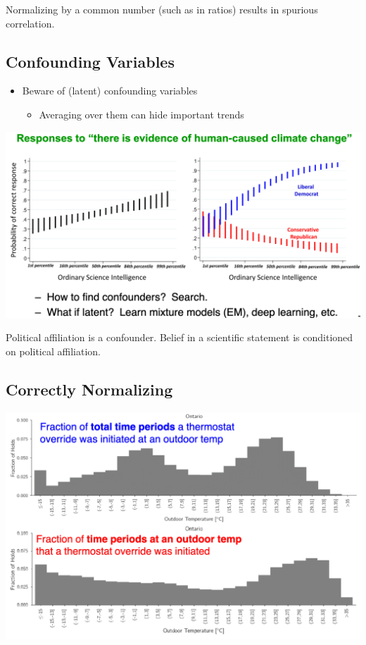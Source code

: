 \documentclass[11pt]{article}
\theoremstyle{definition}
\begin{document}
Normalizing by a common number (such as in ratios) results in spurious correlation.

\subsection{Confounding Variables}
\begin{itemize}
    \item Beware of (latent) confounding variables
    \begin{itemize}
        \item Averaging over them can hide important trends
    \end{itemize}
\end{itemize}

\includegraphics[width=\textwidth]{28.png}

Political affiliation is a confounder. 
Belief in a scientific statement is conditioned on political affiliation.

\subsection{Correctly Normalizing}
\includegraphics[width=\textwidth]{29.png}
\end{document}
